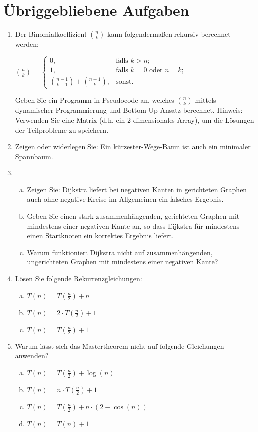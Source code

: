 \documentclass{scrartcl}
\begin{document}
\section*{Übriggebliebene Aufgaben}
\begin{enumerate}[(1)]

\item Der Binomialkoeffizient $\binom{n}{k}$ kann folgendermaßen rekursiv berechnet werden:
\begin{center}
$\binom{n}{k}=\begin{cases}
0, & \text{falls } k > n;\\
1, & \text{falls } k=0 \text{ oder } n=k;\\
\binom{n-1}{k-1} + \binom{n-1}{k}, & \text{sonst.}
\end{cases}$
\end{center}
Geben Sie ein Programm in Pseudocode an, welches $\binom{n}{k}$ mittels dynamischer Programmierung und Bottom-Up-Ansatz berechnet. Hinweis: Verwenden Sie eine Matrix (d.h. ein 2-dimensionales Array), um die Lösungen der Teilprobleme zu speichern.
\item Zeigen oder widerlegen Sie: Ein k\"urzester-Wege-Baum ist auch ein minimaler Spannbaum.

\item \begin{enumerate}[(a)]
\item Zeigen Sie: Dijkstra liefert bei negativen Kanten in gerichteten Graphen auch ohne negative Kreise im Allgemeinen ein falsches Ergebnis.
\item Geben Sie einen stark zusammenh\"angenden, gerichteten Graphen mit mindestens einer negativen Kante an, so dass Dijkstra f\"ur mindestens einen Startknoten ein korrektes Ergebnis liefert.
\item Warum funktioniert Dijkstra nicht auf zusammenh\"angenden, ungerichteten Graphen mit mindestens einer negativen Kante?
\end{enumerate}

\item L\"osen Sie folgende Rekurrenzgleichungen:
\begin{enumerate}[(a)]
\item $T(n)=T(\frac{n}{2})+n$
\item $T(n)=2\cdot T(\frac{n}{2})+1$
\item $T(n)=T(\frac{n}{2})+1$
\end{enumerate}

\item Warum l\"asst sich das Mastertheorem nicht auf folgende Gleichungen anwenden?
\begin{enumerate}[(a)]
\item $T(n)=T(\frac{n}{2})+\log(n)$
\item $T(n)=n\cdot T(\frac{n}{2})+1$
\item $T(n)=T(\frac{n}{2})+n\cdot(2-\cos(n))$
\item $T(n)=T(n)+1$
\end{enumerate}


\end{enumerate}
\end{document}
